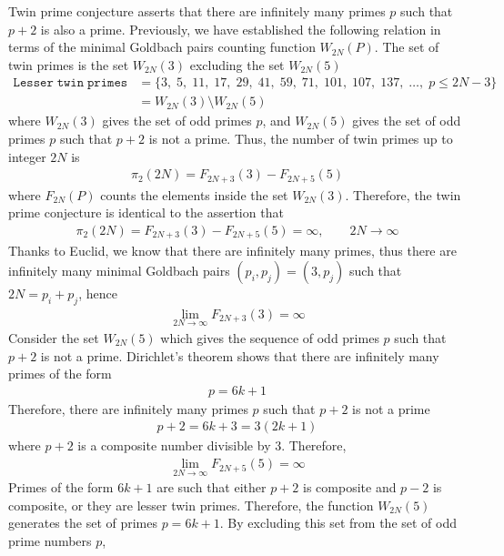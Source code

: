 ﻿Twin prime conjecture asserts that there are infinitely many primes $p$ such that $p+2$ is also a prime.
Previously, we have established the following relation in terms of the minimal Goldbach pairs counting function
$W_{2N}(P)$.
The set of twin primes is the set $W_{2N}(3)$ excluding the set $W_{2N}(5)$
\begin{align*}
    \mathtt{Lesser \; twin \; primes} &= \{ 3, \; 5, \; 11, \; 17, \; 29, \; 41, \; 59, \; 71, \; 101, \; 107, \; 137, \; \dots, \;  p \leq 2N - 3 \} \\
    &= W_{2N}(3) \setminus W_{2N}(5)
\end{align*}
where $W_{2N}(3)$ gives the set of odd primes $p$, and $W_{2N}(5)$ gives the set of odd primes $p$ such that $p+2$
is not a prime.
Thus, the number of twin primes up to integer $2N$ is
\begin{align*}
    \pi_2 (2N) = F_{2N+3}(3) - F_{2N+5}(5)
\end{align*}
where $F_{2N}(P)$ counts the elements inside the set $W_{2N}(3)$.
Therefore, the twin prime conjecture is identical to the assertion that
\begin{align*}
    \pi_2 (2N) = F_{2N+3}(3) - F_{2N+5}(5) = \infty, \quad \quad 2N\to\infty
\end{align*}
Thanks to Euclid, we know that there are infinitely many primes, thus
there are infinitely many minimal Goldbach pairs $(p_i, p_j) = (3, p_j)$ such that $2N=p_i+p_j$,
hence
\begin{align*}
    \lim_{2N\to\infty} F_{2N+3}(3) = \infty
\end{align*}
Consider the set $W_{2N}(5)$ which gives the sequence of odd primes $p$ such that $p+2$ is not a prime.
Dirichlet's theorem shows that there are infinitely many primes of the form
\begin{align*}
    p = 6k+1
\end{align*}
Therefore, there are infinitely many primes $p$ such that $p+2$ is not a prime
\begin{align*}
    p+2 = 6k+3 = 3(2k+1)
\end{align*}
where $p+2$ is a composite number divisible by 3.
Therefore,
\begin{align*}
    \lim_{2N\to\infty} F_{2N+5}(5) = \infty
\end{align*}
Primes of the form $6k+1$ are such that either $p+2$ is composite and $p-2$ is composite,
or they are lesser twin primes.
Therefore, the function $W_{2N}(5)$ generates the set of primes $p=6k+1$.
By excluding this set from the set of odd prime numbers $p$,
